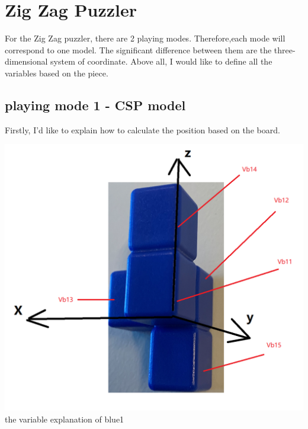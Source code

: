 \chapter{Zig Zag Puzzler}
For the Zig Zag puzzler, there are 2 playing modes. Therefore,each mode will correspond to one model. The significant difference between them are the three-dimensional system of coordinate.
Above all, I would like to define all the variables based on the piece.
\section{playing mode 1 - CSP model}
\label{sec:CSP model1}
Firstly, I'd like to explain how to calculate the position based on the board.
\begin{center}
\includegraphics[scale=0.5]{game2blue1.png}\\
the variable explanation of blue1\\
\end{center}
